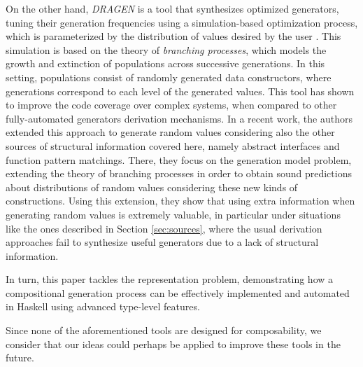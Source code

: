 On the other hand, \emph{DRAGEN} is a tool that synthesizes optimized
generators, tuning their generation frequencies using a simulation-based
optimization process, which is parameterized by the distribution of values
desired by the user \cite{DBLP:conf/haskell/MistaRH18}.
%
This simulation is based on the theory of \emph{branching processes}, which
models the growth and extinction of populations across successive generations.
%
In this setting, populations consist of randomly generated data constructors,
where generations correspond to each level of the generated values.
%
This tool has shown to improve the code coverage over complex systems, when
compared to other fully-automated generators derivation mechanisms.
%
In a recent work, the authors extended this approach to generate random values
considering also the other sources of structural information covered here,
namely abstract interfaces and function pattern matchings.
%
There, they focus on the generation model problem, extending the theory of
branching processes in order to obtain sound predictions about distributions of
random values considering these new kinds of constructions.
%
Using this extension, they show that using extra information when generating
random values is extremely valuable, in particular under situations like the
ones described in Section \ref{sec:sources}, where the usual derivation
approaches fail to synthesize useful generators due to a lack of structural
information.


In turn, this paper tackles the representation problem, demonstrating how a
compositional generation process can be effectively implemented and automated in
Haskell using advanced type-level features.
%

Since none of the aforementioned tools are designed for composability, we
consider that our ideas could perhaps be applied to improve these tools in the
future.
